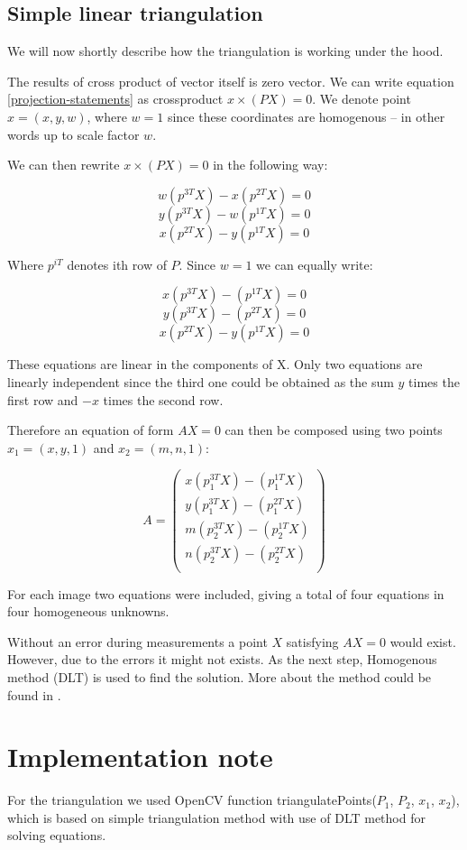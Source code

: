 \subsection{Simple linear triangulation}
We will now shortly describe how the triangulation is working under the hood.

The results of cross product of vector itself is zero vector. We can write
equation \ref{projection-statements} as crossproduct $x \times (PX) = 0$. We
denote point $x = (x, y, w)$, where $w = 1$ since these coordinates are
homogenous -- in other words up to scale factor $w$.


We can then rewrite $x \times (PX) = 0$ in the following way:

$$ w(p^{3T}X) - x(p^{2T}X) = 0 $$
$$ y(p^{3T}X) - w(p^{1T}X) = 0 $$
$$ x(p^{2T}X) - y(p^{1T}X) = 0 $$

Where $p^{iT}$ denotes ith row of $P$. Since $w = 1$ we can equally write:

$$ x(p^{3T}X) - (p^{1T}X) = 0 $$
$$ y(p^{3T}X) - (p^{2T}X) = 0 $$
$$ x(p^{2T}X) - y(p^{1T}X) = 0 $$

These equations are linear in the components of X. Only two equations are
linearly independent since the third one could be obtained as the sum $y$
times the first row and $-x$ times the second row.

Therefore an equation of form $AX = 0$ can then be composed using two points $x_1 = (x, y, 1)$ and $x_2 = (m, n, 1)$:

\[
A = \begin{pmatrix}
x(p_1^{3T}X) - (p_1^{1T}X) \\
y(p_1^{3T}X) - (p_1^{2T}X) \\
m(p_2^{3T}X) - (p_2^{1T}X) \\
n(p_2^{3T}X) - (p_2^{2T}X) \\
\end{pmatrix}
\]

For each image two equations were included, giving a total of four equations in
four homogeneous unknowns.

Without an error during measurements a point $X$ satisfying $AX = 0$ would
exist. However, due to the errors it might not exists. As the next step, Homogenous
method (DLT) is used to find the solution. More about the method could be found
in \citet*{multiple-view-geometry}.

\section{Implementation note}
For the triangulation we used OpenCV function triangulatePoints($P_1$, $P_2$,
$x_1$, $x_2$), which is based on simple triangulation method with use of DLT
method for solving equations.
